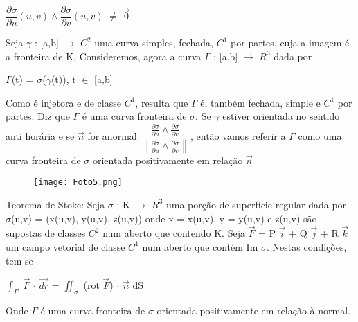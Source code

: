 \documentclass[11pt,a4paper]{article}
\begin{document}
	
	\begin{center}
		$\dfrac{\partial \sigma}{\partial u}(u,v) \wedge \dfrac{\partial \sigma}{\partial v}(u,v)$ $\neq$ $\Vec{0}$\\
	\end{center}
	
	Seja $\gamma$ : [a,b] $\rightarrow$ $C^2$ uma curva simples, fechada, $C^1$ por partes, cuja a imagem é a fronteira de K. Consideremos, agora a curva $\Gamma$ : [a,b] $\rightarrow$ $R^3$ dada por\\
	
	
	\begin{center}
        $\Gamma$(t) = $\sigma$($\gamma$(t)), t $\in$ [a,b]~\\
	\end{center}	
	
    Como é injetora e de classe $C^1$, resulta que $\Gamma$ é, também fechada, simple e $C^1$ por partes. Diz que $\Gamma$ é uma curva fronteira de $\sigma$. Se $\gamma$ estiver orientada no sentido anti horária e se $\Vec{n}$ for anormal $\dfrac{\frac{\partial \sigma }{\partial u} \wedge \frac{\partial \sigma }{\partial v}
        }{\left \| \frac{\partial \sigma }{\partial u} \wedge \frac{\partial \sigma }{\partial v} \right \|}$, então vamos referir a $\Gamma$ como uma curva fronteira de $\sigma$ orientada positivamente em relação $\Vec{n}$\\
        
    
    \begin{figure}[h]	
	\centering %
	\texttt{[image: Foto5.png]}
	\end{figure}
    
    \newpage
    
    
    Teorema de Stoke: Seja $\sigma$ : K $\rightarrow$ $R^3$ uma porção de superfície regular dada por $\sigma$(u,v) = (x(u,v), y(u,v), z(u,v)) onde x = x(u,v), y = y(u,v) e z(u,v) são supostas de classes $C^2$ num aberto que contendo K. Seja $\Vec{F}$ = P $\Vec{i}$ + Q $\Vec{j}$ + R $\Vec{k}$ um campo vetorial de classe $C^1$ num aberto que contém Im $\sigma$. Nestas condições, tem-se\\
    
    
    \begin{center}
        $\int_{\Gamma}^{}$ $\Vec{F}$ $\cdot$ $\Vec{dr}$ = $\iint_{\sigma}^{}$ (rot $\Vec{F}$) $\cdot$ $\Vec{n}$ dS\\
	\end{center}
	
	Onde $\Gamma$ é uma curva fronteira de $\sigma$ orientada positivamente em relação à normal.\\
	
\end{document}
